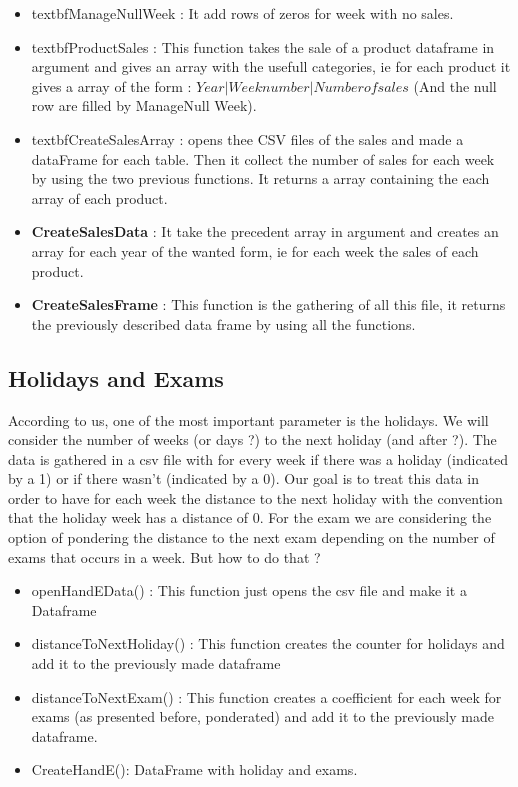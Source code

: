 \documentclass{report}
\begin{document}
\begin{itemize}
\item textbf{ManageNullWeek} : It add rows of zeros for week with no sales.
\item textbf{ProductSales} : This function takes the sale of a product dataframe in argument and gives an array with the usefull categories, ie for each product it gives a array of the form : $Year | Week number  | Number of sales$ (And the null row are filled by ManageNull Week).
\item textbf{CreateSalesArray} : opens thee CSV files of the sales and made a dataFrame for each table. Then it collect the number of sales for each week by using the two previous functions. It returns a array containing the each array of each product.
\item \textbf{CreateSalesData} : It take the precedent array in argument and creates an array for each year of the wanted form, ie for each week the sales of each product.
\item \textbf{CreateSalesFrame} : This function is the gathering of all this file, it returns the previously described data frame by using all the functions.
\end{itemize}

\subsection{Holidays and Exams}

According to us, one of the most important parameter is the holidays. We will consider the number of weeks (or days ?) to the next holiday (and after ?). The data is gathered in a csv file with for every week if there was a holiday (indicated by a 1) or if there wasn't (indicated by a 0). Our goal is to treat this data in order to have for each week the distance to the next holiday with the convention that the holiday week has a distance of 0. 
For the exam we are considering the option of pondering the distance to the next exam depending on the number of exams that occurs in a week. But how to do that ?

\begin{itemize}
\item openHandEData() : This function just opens the csv file and make it a Dataframe
\item distanceToNextHoliday() : This function creates the counter for holidays and add it to the previously made dataframe
\item distanceToNextExam() : This function creates a coefficient for each week for exams (as presented before, ponderated) and add it to the previously made dataframe.
\item CreateHandE(): DataFrame with holiday and exams.
\end{itemize}
\end{document}
